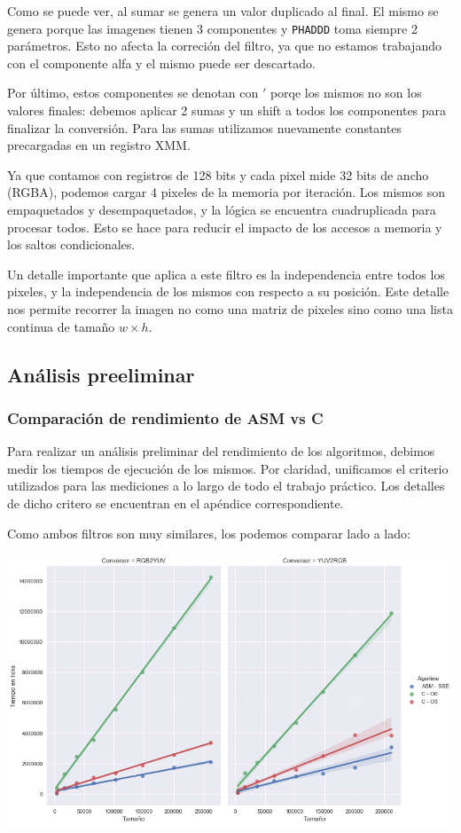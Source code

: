 Como se puede ver, al sumar se genera un valor duplicado al final. El mismo se genera porque las imagenes tienen 3 componentes y \texttt{PHADDD} toma siempre 2 parámetros. Esto no afecta la correción del filtro, ya que no estamos trabajando con el componente alfa y el mismo puede ser descartado.

Por último, estos componentes se denotan con $'$ porqe los mismos no son los valores finales: debemos aplicar 2 sumas y un shift a todos los componentes para finalizar la conversión. Para las sumas utilizamos nuevamente constantes precargadas en un registro XMM.

Ya que contamos con registros de 128 bits y cada pixel mide 32 bits de ancho (RGBA), podemos cargar 4 pixeles de la memoria por iteración. Los mismos son empaquetados y desempaquetados, y la lógica se encuentra cuadruplicada para procesar todos. Esto se hace para reducir el impacto de los accesos a memoria y los saltos condicionales.

Un detalle importante que aplica a este filtro es la independencia entre todos los pixeles, y la independencia de los mismos con respecto a su posición. Este detalle nos permite recorrer la imagen no como una matriz de pixeles sino como una lista continua de tamaño $w \times h$.


\subsection{Análisis preeliminar}
\subsubsection*{Comparación de rendimiento de ASM vs C}

Para realizar un análisis preliminar del rendimiento de los algoritmos, debimos medir los tiempos de ejecución de los mismos. Por claridad, unificamos el criterio utilizados para las mediciones a lo largo de todo el trabajo práctico. Los detalles de dicho critero se encuentran en el apéndice correspondiente.

Como ambos filtros son muy similares, los podemos comparar lado a lado:

\begin{center}
	\includegraphics[scale=0.5]{img/conversores_CvsASMvsO3.png}
\end{center}

